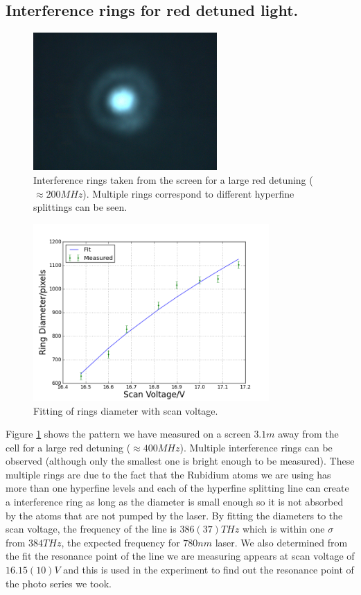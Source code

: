 \documentclass[aps,twocolumn,secnumarabic,balancelastpage,amsmath,amssymb,nofootinbib]{revtex4}
\begin{document}
\subsection{Interference rings for red detuned light.}
\begin{figure}
  \includegraphics[width=7cm]{rings.png}
  \caption{Interference rings taken from the screen for a large red detuning ($\approx 200MHz$). Multiple rings correspond to different hyperfine splittings can be seen.}
  \label{rings}
\end{figure}
\begin{figure}
  \includegraphics[width=9cm]{../data/5-16/ring-fit.png}
  \caption{Fitting of rings diameter with scan voltage.}
  \label{ring_fit}
\end{figure}

Figure \ref{rings} shows the pattern we have measured on a screen $3.1m$ away from the cell for a large red detuning ($\approx 400MHz$). Multiple interference rings can be observed (although only the smallest one is bright enough to be measured). These multiple rings are due to the fact that the Rubidium atoms we are using has more than one hyperfine levels and each of the hyperfine splitting line can create a interference ring as long as the diameter is small enough so it is not absorbed by the atoms that are not pumped by the laser. By fitting the diameters to the scan voltage, the frequency of the line is $386(37)THz$ which is within one $\sigma$ from $384THz$, the expected frequency for $780nm$ laser. We also determined from the fit the resonance point of the line we are measuring appears at scan voltage of $16.15(10)V$ and this is used in the experiment to find out the resonance point of the photo series we took.
\end{document}
